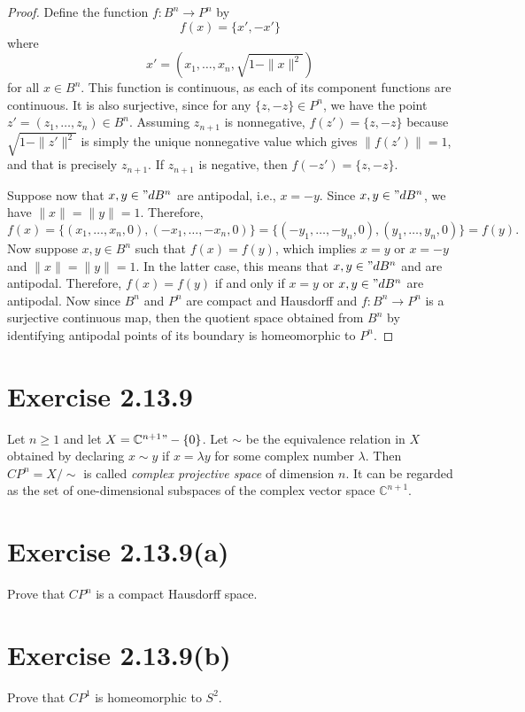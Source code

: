 \documentclass[12pt]{article}
\newenvironment{problem}
    {\begin{lrbox}{\mybox}\begin{minipage}{\textwidth-10pt}}
    {\end{minipage}\end{lrbox}\framebox[6.5in]{\usebox{\mybox}}}
\newcommand{\C}{\mathbb{C}}
\begin{document}
\begin{proof}
    Define the function $f:B^n\to P^n$ by
    \[f(x) = \{x',-x'\}\]
    where
    \[x' = (x_1,\dots,x_n,\sqrt{1-\|x\|^2})\]
    for all $x\in B^n$. This function is continuous, as each of its component functions are continuous. It is also surjective, since for any $\{z,-z\}\in P^n$, we have the point $z'=(z_1,\dots,z_n)\in B^n$. Assuming $z_{n+1}$ is nonnegative, $f(z')=\{z,-z\}$ because $\sqrt{1-\|z'\|^2}$ is simply the unique nonnegative value which gives $\|f(z')\|=1$, and that is precisely $z_{n+1}$. If $z_{n+1}$ is negative, then $f(-z')=\{z,-z\}$.
    
    Suppose now that $x,y\in "dB^n$ are antipodal, i.e., $x=-y$. Since $x,y\in"dB^n$, we have $\|x\|=\|y\|=1$. Therefore,
    \[f(x) = \{(x_1,\dots,x_n,0),(-x_1,\dots,-x_n,0)\} = \{(-y_1,\dots,-y_n,0),(y_1,\dots,y_n,0)\} = f(y).\]
    Now suppose $x,y\in B^n$ such that $f(x)=f(y)$, which implies $x=y$ or $x=-y$ and $\|x\|=\|y\|=1$. In the latter case, this means that $x,y\in"dB^n$ and are antipodal. Therefore, $f(x)=f(y)$ if and only if $x=y$ or $x,y\in"dB^n$ are antipodal. Now since $B^n$ and $P^n$ are compact and Hausdorff and $f:B^n\to P^n$ is a surjective continuous map, then the quotient space obtained from $B^n$ by identifying antipodal points of its boundary is homeomorphic to $P^n$.
    
\end{proof}

\section*{Exercise 2.13.9}
\begin{problem}
    Let $n\geq 1$ and let $X=\C^{n+1}"-\{0\}$. Let $\sim$ be the equivalence relation  in $X$ obtained by declaring $x\sim y$ if $x=\lambda y$ for some complex number $\lambda$. Then $CP^n = X/\sim$ is called \emph{complex projective space} of dimension $n$. It can be regarded as the set of one-dimensional subspaces of the complex vector space $\C^{n+1}$. 
\end{problem}

\section*{Exercise 2.13.9(a)}
\begin{problem}
    Prove that $CP^n$ is a compact Hausdorff space.
\end{problem}


\section*{Exercise 2.13.9(b)}
\begin{problem}
    Prove that $CP^1$ is homeomorphic to $S^2$.
\end{problem}
\end{document}
